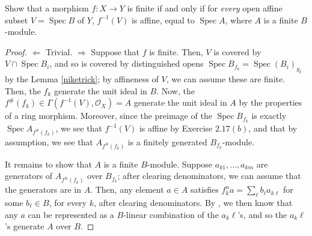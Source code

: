 \documentclass[10pt]{article}
\theoremstyle{definition}
\theoremstyle{remark}
\numberwithin{equation}{section}
\numberwithin{figure}{subsubsection}
\DeclareMathOperator{\Spec}{Spec}
\newcommand{\OO}{\mathcal{O}}
\begin{document}
\begin{problem}
  Show that a morphism $f\colon X \to Y$ is finite if and only if for \emph{every} open affine subset $V = \Spec B$ of $Y$, $f^{-1}(V)$ is affine, equal to $\Spec A$, where $A$ is a finite $B$-module.
\end{problem}
\begin{proof}
  $\Leftarrow$ Trivial. $\Rightarrow$ Suppose that $f$ is finite. Then, $V$ is
  covered by $V \cap \Spec B_i$, and so is covered by distinguished opens $\Spec
  B_{f_k} = \Spec (B_i)_{g_k}$ by the Lemma \ref{niketrick}; by
  affineness of $V$, we can assume these are finite. Then, the $f_k$ generate
  the unit ideal in $B$. Now, the $f^\#(f_k) \in \Gamma(f^{-1}(V),\OO_X) = A$
  generate the unit ideal in $A$ by the properties of a ring morphism. Moreover,
  since the preimage of the $\Spec B_{f_k}$ is exactly $\Spec A_{f^\#(f_k)}$, we
  see that $f^{-1}(V)$ is affine by Exercise $2.17(b)$, and that by assumption,
  we see that $A_{f^\#(f_k)}$ is a finitely generated $B_{f_k}$-module.
  \par It remains to show that $A$ is a finite $B$-module. Suppose
  $a_{k1},\ldots,a_{km}$ are generators of $A_{f^\#(f_k)}$ over $B_{f_k}$; after
  clearing denominators, we can assume that the generators are in $A$. Then, any
  element $a \in A$ satisfies $f_k^na = \sum_\ell b_\ell a_{k\ell}$ for some
  $b_\ell \in B$, for every $k$, after clearing denominators. By
  \cite[Exc.\ 1.13iv]{AM69}, we then know that any $a$ can be represented as a
  $B$-linear combination of the $a_k\ell$'s, and so the $a_k\ell$'s generate $A$
  over $B$.
\end{proof}
\end{document}
